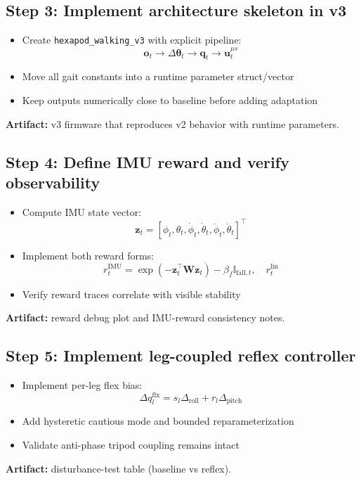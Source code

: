 \documentclass[11pt]{article}
\begin{document}
\subsection*{Step 3: Implement architecture skeleton in v3}
\begin{itemize}
    \item Create \texttt{hexapod\_walking\_v3} with explicit pipeline:
    \[
    \mathbf{o}_t \rightarrow \Delta\boldsymbol{\theta}_t \rightarrow \mathbf{q}_t \rightarrow \mathbf{u}^{\mu s}_t
    \]
    \item Move all gait constants into a runtime parameter struct/vector
    \item Keep outputs numerically close to baseline before adding adaptation
\end{itemize}
\textbf{Artifact:} v3 firmware that reproduces v2 behavior with runtime parameters.

\subsection*{Step 4: Define IMU reward and verify observability}
\begin{itemize}
    \item Compute IMU state vector:
    \[
    \mathbf{z}_t=[\phi_t,\theta_t,\dot{\phi}_t,\dot{\theta}_t,\ddot{\phi}_t,\ddot{\theta}_t]^{\top}
    \]
    \item Implement both reward forms:
    \[
    r_t^{\mathrm{IMU}}=\exp(-\mathbf{z}_t^{\top}\mathbf{W}\mathbf{z}_t)-\beta_f\mathbb{I}_{\mathrm{fall},t},
    \quad
    r_t^{\mathrm{lin}}
    \]
    \item Verify reward traces correlate with visible stability
\end{itemize}
\textbf{Artifact:} reward debug plot and IMU-reward consistency notes.

\subsection*{Step 5: Implement leg-coupled reflex controller}
\begin{itemize}
    \item Implement per-leg flex bias:
    \[
    \Delta q^{\mathrm{flx}}_{l}=s_l\Delta_{\mathrm{roll}}+r_l\Delta_{\mathrm{pitch}}
    \]
    \item Add hysteretic cautious mode and bounded reparameterization
    \item Validate anti-phase tripod coupling remains intact
\end{itemize}
\textbf{Artifact:} disturbance-test table (baseline vs reflex).
\end{document}
